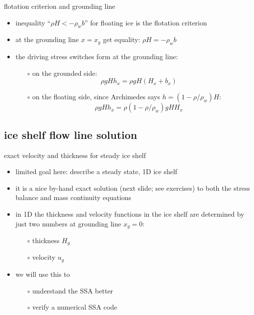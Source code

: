 \begin{frame}{flotation criterion and grounding line}

\begin{itemize}
\item inequality ``$\rho H < - \rho_w b$'' for floating ice is the \alert{flotation criterion}
\item at the grounding line $x=x_g$ get equality: $\rho H = - \rho_w b$
\item the driving stress switches form at the grounding line:
  \begin{itemize}
  \item[$\circ$] on the grounded side:
    $$\rho g H h_x = \rho g H (H_x + b_x)$$
  \item[$\circ$] on the floating side, since Archimedes says $h = (1-\rho/\rho_w) H$:
    $$\rho g H h_x = \rho(1-\rho/\rho_w) g H H_x$$
  \end{itemize}
\end{itemize}
\end{frame}



\subsection{ice shelf flow line solution}


\begin{frame}{exact velocity and thickness for steady ice shelf}

\begin{itemize}
\item limited goal here: describe a steady state, 1D ice shelf
\item it is a nice \alert{by-hand} exact solution (next slide; see exercises) to both the stress balance and mass continuity equations
\item in 1D the thickness and velocity functions in the ice shelf are determined by just two numbers at grounding line $x_g=0$:
  \begin{itemize}
  \item[$\circ$] thickness $H_g$
  \item[$\circ$] velocity $u_g$
  \end{itemize}
\item we will use this to
  \begin{itemize}
  \item[$\circ$] understand the SSA better
  \item[$\circ$] verify a numerical SSA code
  \end{itemize}
\end{itemize}
\end{frame}


